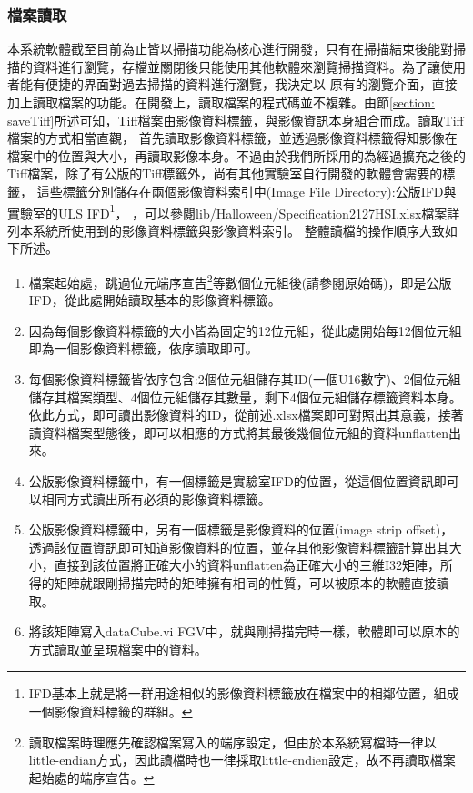 \documentclass[12pt]{article}
\begin{document}
\subsubsection{檔案讀取}
本系統軟體截至目前為止皆以掃描功能為核心進行開發，只有在掃描結束後能對掃描的資料進行瀏覽，存檔並關閉後只能使用其他軟體來瀏覽掃描資料。為了讓使用者能有便捷的界面對過去掃描的資料進行瀏覽，我決定以
原有的瀏覽介面，直接加上讀取檔案的功能。在開發上，讀取檔案的程式碼並不複雜。由節\ref{section: saveTiff}所述可知，Tiff檔案由影像資料標籤，與影像資訊本身組合而成。讀取Tiff檔案的方式相當直觀，
首先讀取影像資料標籤，並透過影像資料標籤得知影像在檔案中的位置與大小，再讀取影像本身。不過由於我們所採用的為經過擴充之後的Tiff檔案，除了有公版的Tiff標籤外，尚有其他實驗室自行開發的軟體會需要的標籤，
這些標籤分別儲存在兩個影像資料索引中(Image File Directory):公版IFD與實驗室的ULS IFD\footnote{IFD基本上就是將一群用途相似的影像資料標籤放在檔案中的相鄰位置，組成一個影像資料標籤的群組。}，
，可以參閱lib/Halloween/Specification21\textunderscore27HSI.xlsx檔案詳列本系統所使用到的影像資料標籤與影像資料索引。
整體讀檔的操作順序大致如下所述。
\begin{enumerate}
    \item 檔案起始處，跳過位元端序宣告\footnote{讀取檔案時理應先確認檔案寫入的端序設定，但由於本系統寫檔時一律以little-endian方式，因此讀檔時也一律採取little-endien設定，故不再讀取檔案起始處的端序宣告。}等數個位元組後(請參閱原始碼)，即是公版IFD，從此處開始讀取基本的影像資料標籤。
    \item 因為每個影像資料標籤的大小皆為固定的12位元組，從此處開始每12個位元組即為一個影像資料標籤，依序讀取即可。
    \item 每個影像資料標籤皆依序包含:2個位元組儲存其ID(一個U16數字)、2個位元組儲存其檔案類型、4個位元組儲存其數量，剩下4個位元組儲存標籤資料本身。依此方式，即可讀出影像資料的ID，從前述.xlsx檔案即可對照出其意義，接著讀資料檔案型態後，即可以相應的方式將其最後幾個位元組的資料unflatten出來。
    \item 公版影像資料標籤中，有一個標籤是實驗室IFD的位置，從這個位置資訊即可以相同方式讀出所有必須的影像資料標籤。
    \item 公版影像資料標籤中，另有一個標籤是影像資料的位置(image strip offset)，透過該位置資訊即可知道影像資料的位置，並存其他影像資料標籤計算出其大小，直接到該位置將正確大小的資料unflatten為正確大小的三維I32矩陣，所得的矩陣就跟剛掃描完時的矩陣擁有相同的性質，可以被原本的軟體直接讀取。
    \item 將該矩陣寫入dataCube.vi FGV中，就與剛掃描完時一樣，軟體即可以原本的方式讀取並呈現檔案中的資料。
\end{enumerate}
\end{document}
